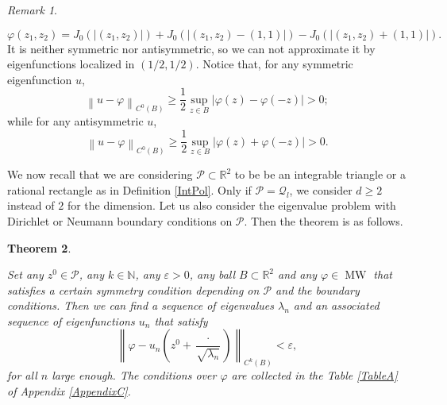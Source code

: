\documentclass{amsart}
\newtheorem{theorem}{Theorem}[section]
\theoremstyle{definition}
\theoremstyle{remark}
\newtheorem{remark}[theorem]{Remark}
\newcommand{\ep}{\varepsilon}
\newcommand{\vp}{\varphi}
\def\RR{\mathbb{R}}
\renewcommand\geq\geqslant
\numberwithin{equation}{section}
\theoremstyle{definition}
\theoremstyle{remark}
\def\RR{\mathbb{R}}
\DeclareMathOperator\MW{MW}
\begin{document}
\begin{remark}
\begin{enumerate}
\begin{equation}
		\vp(z_1,z_2)=J_0(\left|(z_1,z_2)\right|)+J_0(\left|(z_1,z_2)-(1,1)\right|)-J_0(\left|(z_1,z_2)+(1,1)\right|).
	\end{equation}It is neither symmetric nor antisymmetric, so we can not approximate it by eigenfunctions localized in $(1/2,1/2)$. Notice that, for any symmetric eigenfunction $u$,\begin{equation}
		\left\|u-\vp\right\|_{C^0(B)}\geq\frac{1}{2}\sup_{z\in B}\left|\vp(z)-\vp(-z)\right|>0;
	\end{equation}while for any antisymmetric $u$, \begin{equation}
		\left\|u-\vp\right\|_{C^0(B)}\geq\frac{1}{2}\sup_{z\in B}\left|\vp(z)+\vp(-z)\right|>0.
	\end{equation}
\end{enumerate}

\end{remark}
We now recall that we are considering $\mathcal{P}\subset\RR^2$ to be be an integrable triangle or a rational rectangle as in Definition \ref{IntPol}. Only if $\mathcal{P}=\mathcal{Q}_l$, we consider $d\geq2$ instead of $2$ for the dimension. Let us also consider the eigenvalue problem with Dirichlet or Neumann boundary conditions on $\mathcal{P}$. Then the theorem is as follows. 
\begin{theorem}\label{Allpoints}

Set any $z^0\in \mathcal{P}$, any $k\in\mathbb{N}$, any $\ep>0$, any ball $B\subset \mathbb{R}^2$ and any $\vp\in\MW$ that satisfies a certain symmetry condition depending on $\mathcal{P}$ and the boundary conditions. 
Then we can find a sequence of eigenvalues $\lambda_n$ and an associated sequence of eigenfunctions $u_{n}$ that satisfy  \begin{equation}
	\left\|\vp-u_{n}\left(z^0+\frac{\cdot}{\sqrt{\lambda_n}}\right)\right\|_{C^k(B)}<\ep,
\end{equation}for all $n$ large enough. The conditions over $\vp$ are collected in the Table \ref{TableA} of Appendix \ref{AppendixC}.

	
	
\end{theorem}
\end{document}
